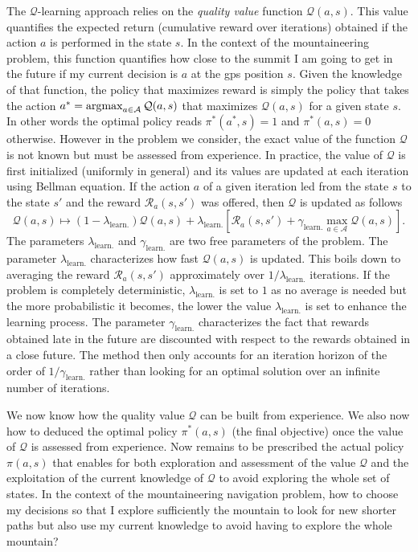 The $\mathcal{Q}$-learning approach relies on the \textit{quality value} function $\mathcal{Q}(a, s)$.
This value quantifies the expected return (cumulative reward over iterations) obtained if the action $a$ is performed in the state $s$.
In the context of the mountaineering problem, this function quantifies how close to the summit I am going to get in the future if my current decision is $a$ at the gps position $s$.
Given the knowledge of that function, the policy that maximizes reward is simply the policy that takes the action $a^* = \operatorname{argmax}_{a \in \mathcal{A}} \mathcal{Q}(a, s)$ that maximizes $\mathcal{Q}(a, s)$ for a given state $s$.
In other words the optimal policy reads $\pi^*(a^*, s) = 1$ and $\pi^*(a, s) = 0$ otherwise.
However in the problem we consider, the exact value of the function $\mathcal{Q}$ is not known but must be assessed from experience.
In practice, the value of $\mathcal{Q}$ is first initialized (uniformly in general) and its values are updated at each iteration using Bellman equation.
If the action $a$ of a given iteration led from the state $s$ to the state $s'$ and the reward $\mathcal{R}_a(s, s')$ was offered, then $\mathcal{Q}$ is updated as follows
\begin{equation}
	\mathcal{Q}(a, s) \mapsto (1 - \lambda_{\mathrm{learn.}}) \mathcal{Q}(a, s) + \lambda_{\mathrm{learn.}} \left[ \mathcal{R}_a(s, s') + \gamma_{\mathrm{learn.}} \max_{a \in \mathcal{A}} \mathcal{Q}(a, s) \right].
\end{equation}
The parameters $\lambda_{\mathrm{learn.}}$ and $\gamma_{\mathrm{learn.}}$ are two free parameters of the problem.
The parameter $\lambda_{\mathrm{learn.}}$ characterizes how fast $\mathcal{Q}(a, s)$ is updated.
This boils down to averaging the reward $\mathcal{R}_a(s, s')$ approximately over $1/\lambda_{\mathrm{learn.}}$ iterations.
If the problem is completely deterministic, $\lambda_{\mathrm{learn.}}$ is set to $1$ as no average is needed but the more probabilistic it becomes, the lower the value $\lambda_{\mathrm{learn.}}$ is set to enhance the learning process.
The parameter $\gamma_{\mathrm{learn.}}$ characterizes the fact that rewards obtained late in the future are discounted with respect to the rewards obtained in a close future.
The method then only accounts for an iteration horizon of the order of $1/\gamma_{\mathrm{learn.}}$ rather than looking for an optimal solution over an infinite number of iterations.

We now know how the quality value $\mathcal{Q}$ can be built from experience.
We also now how to deduced the optimal policy $\pi^*(a, s)$ (the final objective) once the value of $\mathcal{Q}$ is assessed from experience.
Now remains to be prescribed the actual policy $\pi(a, s)$ that enables for both exploration and assessment of the value $\mathcal{Q}$ and the exploitation of the current knowledge of $\mathcal{Q}$ to avoid exploring the whole set of states.
In the context of the mountaineering navigation problem, how to choose my decisions so that I explore sufficiently the mountain to look for new shorter paths but also use my current knowledge to avoid having to explore the whole mountain?

